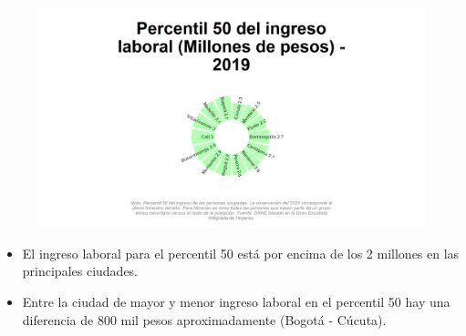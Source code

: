     \begin{figure}[H]
    \caption[Percentil 50 del ingreso laboral por ciudades principales - 2019]{\label{ingreso_laboral_50_ciudades}}
        \begin{center}
        \includegraphics[width=\textwidth,keepaspectratio]{img/var_25605_static.png}
        \end{center}
    \end{figure}
            \begin{itemize}
                    \item El ingreso laboral para el percentil 50 está por encima de los 2 millones en las principales ciudades.
                    \item Entre la ciudad de mayor y menor ingreso laboral en el percentil 50 hay una diferencia de 800 mil pesos aproximadamente (Bogotá - Cúcuta).
                \end{itemize}

